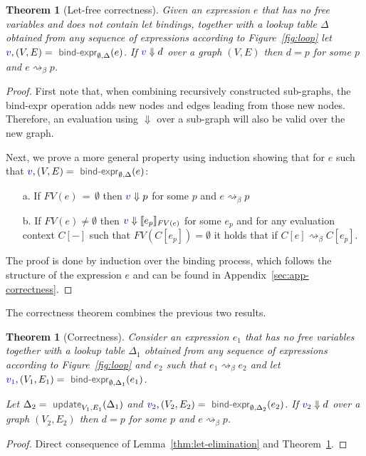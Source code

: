 \documentclass[acmsmall,anonymous,fleqn]{acmart}\settopmatter{printfolios=false,printccs=false,printacmref=false}
\newcounter{thc}
\theoremstyle{plain}
\newtheorem{theorem}[thc]{Theorem}
\theoremstyle{definition}
\newcommand{\ident}[1]{\textnormal{\textcolor{idclr}{\sffamily #1}}}
\newcommand{\bndclr}[1]{\textcolor{kvdclr}{#1}}
\begin{document}
\begin{theorem}[Let-free correctness]
\label{thm:let-free-correct}
Given an expression $e$ that has no free variables and does not contain let bindings, together
with a lookup table $\Delta$ obtained from any sequence of expressions according to Figure~\ref{fig:loop}
let $\bndclr{v}, (V, E) = \ident{bind-expr}_{\emptyset, \Delta}(e)$. If $\bndclr{v}\Downarrow d$
over a graph $(V, E)$ then $d = p$ for some $p$ and $e \rightsquigarrow_\beta p$.
\end{theorem}
\begin{proof}
First note that, when combining recursively constructed sub-graphs, the \ident{bind-expr} operation
adds new nodes and edges leading from those new nodes. Therefore, an evaluation using $\Downarrow$
over a sub-graph will also be valid over the new graph.

Next, we prove a more general property using induction showing that for $e$ such
that $\bndclr{v}, (V, E) = \ident{bind-expr}_{\emptyset, \Delta}(e)$:
\begin{enumerate}
\item[a.] If $FV(e)\,=\,\emptyset$ then $\bndclr{v} \Downarrow p$ for some $p$ and $e \rightsquigarrow_\beta p$
\item[b.] If $FV(e)\neq\emptyset$ then $\bndclr{v} \Downarrow \llbracket e_p \rrbracket_{FV(e)}$ for some $e_p$ and
  for any evaluation context $C[-]$ such that $FV(C[e_p])=\emptyset$ it holds that if
  $C[e] \rightsquigarrow_\beta C[e_p]$.
\end{enumerate}
%
The proof is done by induction over the binding process, which follows the structure
of the expression $e$ and can be found in Appendix~\ref{sec:app-correctness}.
\end{proof}

\noindent
The correctness theorem combines the previous two results.

\begin{theorem}[Correctness]
\label{thm:correcntess}
Consider an expression $e_1$ that has no free variables together with a lookup table $\Delta_1$ obtained
from any sequence of expressions according to Figure~\ref{fig:loop} and $e_2$ such that
$e_1\rightsquigarrow_\beta e_2$ and let $\bndclr{v_1}, (V_1, E_1) = \ident{bind-expr}_{\emptyset, \Delta_1}(e_1)$.

Let $\Delta_2 = \ident{update}_{V_1, E_1}(\Delta_1)$ and $\bndclr{v_2}, (V_2, E_2) = \ident{bind-expr}_{\emptyset, \Delta_2}(e_2)$.
If $\bndclr{v_2}\Downarrow d$ over a graph $(V_2, E_2)$ then $d = p$ for some $p$ and $e \rightsquigarrow_\beta p$.
\end{theorem}
\begin{proof}
Direct consequence of Lemma~\ref{thm:let-elimination} and Theorem~\ref{thm:let-free-correct}.
\end{proof}
\end{document}
